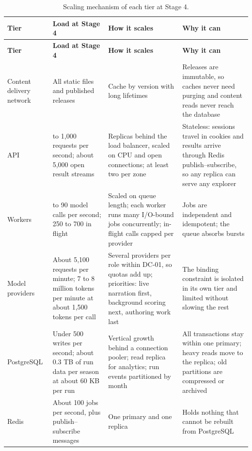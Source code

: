 {\small
\begin{longtable}{|>{\raggedright\arraybackslash}p{}|>{\raggedright\arraybackslash}p{}|>{\raggedright\arraybackslash}p{}|>{\raggedright\arraybackslash}p{}|}
\caption{Scaling mechanism of each tier at Stage 4.} \\
\hline
\textbf{Tier} & \textbf{Load at Stage 4} & \textbf{How it scales} & \textbf{Why it can} \\ \hline
\endfirsthead
\hline
\textbf{Tier} & \textbf{Load at Stage 4} & \textbf{How it scales} & \textbf{Why it can} \\ \hline
\endhead
Content delivery network & All static files and published releases & Cache by version with long lifetimes & Releases are immutable, so caches never need purging and content reads never reach the database \\ \hline
API & 500 to 1,000 requests per second; about 5,000 open result streams & Replicas behind the load balancer, scaled on CPU and open connections; at least two per zone & Stateless: sessions travel in cookies and results arrive through Redis publish--subscribe, so any replica can serve any explorer \\ \hline
Workers & 80 to 90 model calls per second; 250 to 700 in flight & Scaled on queue length; each worker runs many I/O-bound jobs concurrently; in-flight calls capped per provider & Jobs are independent and idempotent; the queue absorbs bursts\cite{r170} \\ \hline
Model providers & About 5,100 requests per minute; 7 to 8 million tokens per minute at about 1,500 tokens per call & Several providers per role within DC-01, so quotas add up; priorities: live narration first, background scoring next, authoring work last & The binding constraint is isolated in its own tier and limited without slowing the rest \\ \hline
PostgreSQL & Under 500 writes per second; about 0.3 TB of run data per season at about 60 KB per run & Vertical growth behind a connection pooler; read replica for analytics; run events partitioned by month & All transactions stay within one primary; heavy reads move to the replica; old partitions are compressed or archived \\ \hline
Redis & About 100 jobs per second, plus publish--subscribe messages & One primary and one replica & Holds nothing that cannot be rebuilt from PostgreSQL \\ \hline
\end{longtable}
}

